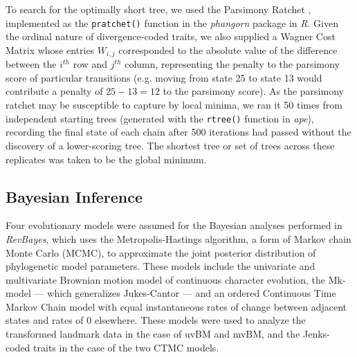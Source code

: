 \documentclass[10pt, twocolumn, twoside]{article}
\begin{document}
To search for the optimally short tree, we used the Parsimony Ratchet \citep{nixonParsimonyRatchetNew1999}, implemented as the \texttt{pratchet()} function in the \textit{phangorn} package in \textit{R}. Given the ordinal nature of divergence-coded traits, we also supplied a Wagner Cost Matrix whose entries $W_{i,j}$ corresponded to the absolute value of the difference between the $i^{th}$ row and $j^{th}$ column, representing the penalty to the parsimony score of particular transitions (e.g. moving from state 25 to state 13 would contribute a penalty of $25 - 13 = 12$ to the parsimony score). As the parsimony ratchet may be susceptible to capture by local minima, we ran it 50 times from independent starting trees (generated with the \texttt{rtree()} function in \textit{ape}), recording the final state of each chain after 500 iterations had passed without the discovery of a lower-scoring tree. The shortest tree or set of trees across these replicates was taken to be the global minimum.

\subsection{Bayesian Inference}

Four evolutionary models were assumed for the Bayesian analyses performed in \textit{RevBayes}, which uses the Metropolis-Hastings algorithm, a form of Markov chain Monte Carlo (MCMC), to approximate the joint posterior distribution of phylogenetic model parameters. These models include the univariate and multivariate Brownian motion model of continuous character evolution, the Mk-model --- which generalizes Jukes-Cantor --- and an ordered Continuous Time Markov Chain model with equal instantaneous rates of change between adjacent states and rates of 0 elsewhere. These models were used to analyze the transformed landmark data in the case of uvBM and mvBM, and the Jenks-coded traits in the case of the two CTMC models.
\end{document}
